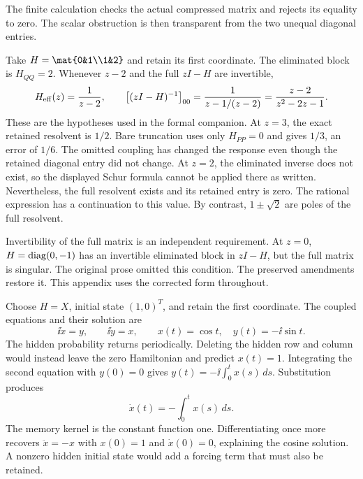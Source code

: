 The finite calculation checks the actual compressed matrix and rejects its equality to zero. The scalar obstruction is then transparent from the two unequal diagonal entries.

Take $H=\mat{0&1\\1&2}$ and retain its first coordinate. The eliminated block is $H_{QQ}=2$. Whenever $z-2$ and the full $zI-H$ are invertible,
\[
H_{\rm eff}(z)=\frac1{z-2},\qquad
\bigl[(zI-H)^{-1}\bigr]_{00}
=\frac1{z-1/(z-2)}=\frac{z-2}{z^2-2z-1}.
\]
These are the hypotheses used in the formal companion.
At $z=3$, the exact retained resolvent is $1/2$. Bare truncation uses only $H_{PP}=0$ and gives $1/3$, an error of $1/6$. The omitted coupling has changed the response even though the retained diagonal entry did not change.
At $z=2$, the eliminated inverse does not exist, so the displayed Schur formula cannot be applied there as written. Nevertheless, the full resolvent exists and its retained entry is zero. The rational expression has a continuation to this value. By contrast, $1\pm\sqrt2$ are poles of the full resolvent.

Invertibility of the full matrix is an independent requirement. At $z=0$, $H=\operatorname{diag}(0,-1)$ has an invertible eliminated block in $zI-H$, but the full matrix is singular. The original prose omitted this condition. The preserved amendments restore it. This appendix uses the corrected form throughout.

Choose $H=X$, initial state $(1,0)^T$, and retain the first coordinate. The coupled equations and their solution are
\[
\ii\dot x=y,\qquad \ii\dot y=x,\qquad
x(t)=\cos t,\quad y(t)=-\ii\sin t.
\]
The hidden probability returns periodically. Deleting the hidden row and column would instead leave the zero Hamiltonian and predict $x(t)=1$.
Integrating the second equation with $y(0)=0$ gives $y(t)=-\ii\int_0^tx(s)\,ds$. Substitution produces
\[
\dot x(t)=-\int_0^tx(s)\,ds.
\]
The memory kernel is the constant function one. Differentiating once more recovers $\ddot x=-x$ with $x(0)=1$ and $\dot x(0)=0$, explaining the cosine solution. A nonzero hidden initial state would add a forcing term that must also be retained.

